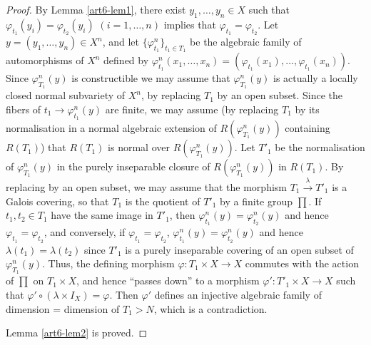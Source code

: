 \begin{proof}
By Lemma \ref{art6-lem1}, there exist $y_1, \ldots, y_n \in X$ such that $\varphi_{t_1} (y_i) = \varphi_{t_2} (y_i)$ $(i = 1, \ldots, n)$ implies that $\varphi_{t_1} = \varphi_{t_2}$. Let $y = (y_1, \ldots, y_n) \in X^n$, and let $\{\varphi^n_{t_1}\}_{t_1 \in T_1}$ be the algebraic family of automorphisms of $X^n$ defined by $\varphi^n_{t_1} (x_1, \ldots, x_n) = (\varphi_{t_1} (x_1), \ldots, \varphi_{t_1} (x_n))$. Since $\varphi^n_{T_1} (y)$ is constructible we may assume that $\varphi^n_{T_1} (y)$ is actually a locally closed normal subvariety of $X^n$, by replacing $T_1$ by an open subset. Since the fibers of $t_1 \to \varphi^n_{t_1} (y)$ are finite, we may assume (by replacing $T_1$ by its normalisation in a normal algebraic extension of $R (\varphi^n_{T_1} (y))$ containing $R (T_1)$) that $R (T_1)$ is normal over $R (\varphi^n_{T_1} (y))$. Let $T'_1$ be the normalisation of $\varphi^n_{T_1} (y)$ in the purely inseparable closure of $R (\varphi^n_{T_1} (y))$ in $R (T_1)$. By replacing by an open subset, we may assume that the morphism $T_1 \xrightarrow{\lambda} T'_1$ is a Galois covering, so that $T_1$ is the quotient of $T'_1$ by a finite group $\prod$.
If $t_1, t_2 \in T_1$ have the same image in $T'_1$, then $\varphi^n_{t_1} (y) = \varphi^n_{t_2} (y)$ and hence $\varphi_{t_1} = \varphi_{t_2}$, and conversely, if $\varphi_{t_1} = \varphi_{t_2}$, $\varphi^n_{t_1} (y) = \varphi^n_{t_2} (y)$ and hence $\lambda (t_1) = \lambda (t_2)$ since $T'_1$ is a purely inseparable covering of an open subset of $\varphi^n_{T_1} (y)$. Thus, the defining morphism $\varphi: T_1 \times X \to X$ commutes with the action of $\prod$ on $T_1 \times X$, and hence ``passes down'' to a morphism $\varphi' : T'_1 \times X \to X $ such that $\varphi' \circ (\lambda \times I_X) = \varphi$. Then $\varphi'$ defines an injective algebraic family of dimension = dimension of $T_1 > N$, which is a contradiction.

Lemma \ref{art6-lem2} is proved.
\end{proof}


